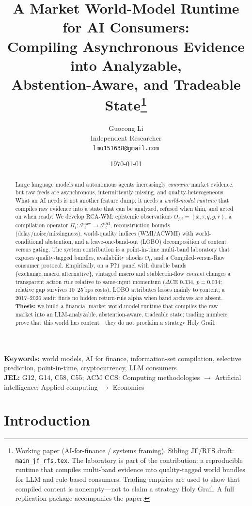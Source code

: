 \documentclass[12pt]{article}
\title{A Market World-Model Runtime for AI Consumers:\\
Compiling Asynchronous Evidence into Analyzable,\\
Abstention-Aware, and Tradeable State\footnote{Working paper (AI-for-finance / systems framing). Sibling JF/RFS draft: \texttt{main\_jf\_rfs.tex}. The laboratory is part of the contribution: a reproducible runtime that compiles multi-band evidence into quality-tagged world bundles for LLM and rule-based consumers. Trading empirics are used to show that compiled content is nonempty---not to claim a strategy Holy Grail. A full replication package accompanies the paper.}}
\author{Guocong Li\\
Independent Researcher\\
\texttt{lmu151638@gmail.com}}
\date{\today}
\begin{document}
\maketitle

\begin{abstract}
Large language models and autonomous agents increasingly \emph{consume} market evidence, but raw feeds are asynchronous, intermittently missing, and quality-heterogeneous. What an AI needs is not another feature dump: it needs a \emph{world-model runtime} that compiles raw evidence into a state that can be analyzed, refused when thin, and acted on when ready. We develop RCA-WM: epistemic observations $O_{j,t}=(x,\tau,q,g,r)$, a compilation operator $\Pi_t:\mathcal{F}^{\mathrm{raw}}_t\to\mathcal{F}^{\mathrm{AI}}_t$, reconstruction bounds (delay/noise/missingness), world-quality indices (WMI/ACWMI) with world-conditional abstention, and a leave-one-band-out (LOBO) decomposition of content versus gating. The system contribution is a point-in-time multi-band laboratory that exposes quality-tagged bundles, availability shocks $O_t$, and a Compiled-versus-Raw consumer protocol. Empirically, on a PIT panel with durable bands $\{\mathrm{exchange},\mathrm{macro},\mathrm{alternative}\}$, vintaged macro and stablecoin-flow \emph{content} changes a transparent action rule relative to same-input momentum ($\Delta$CE $0.334$, $p=0.034$; relative gap survives 10--25\,bps costs). LOBO attributes losses mainly to content; a 2017--2026 audit finds no hidden return-rule alpha when band archives are absent. \textbf{Thesis:} we build a financial-market world-model runtime that compiles the raw market into an LLM-analyzable, abstention-aware, tradeable state; trading numbers prove that this world has content---they do not proclaim a strategy Holy Grail.
\end{abstract}

\noindent\textbf{Keywords:} world models, AI for finance, information-set compilation, selective prediction, point-in-time, cryptocurrency, LLM consumers\\
\textbf{JEL:} G12, G14, C58, C55; ACM CCS: Computing methodologies $\rightarrow$ Artificial intelligence; Applied computing $\rightarrow$ Economics

\tableofcontents
\newpage

\section{Introduction}
\label{sec:intro}
\end{document}
